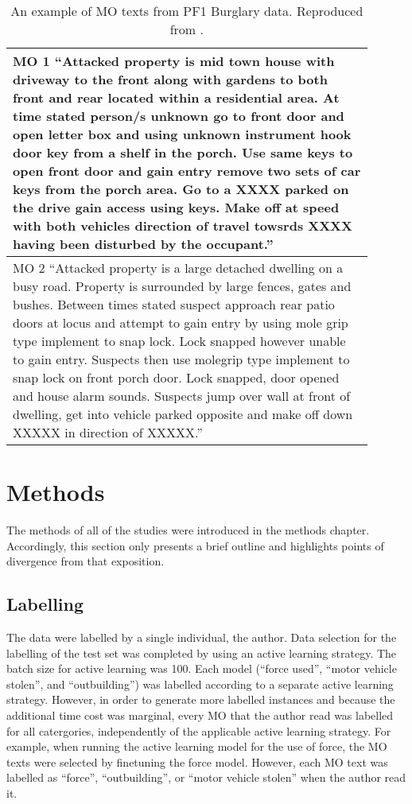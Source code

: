 \begin{table}[]
\begin{tabular}{p{0.9\linewidth}}
\toprule
MO 1 “Attacked property is mid town house with driveway to the front along with gardens to both front and rear located within a residential area. At time stated person/s unknown go to front door and open letter box and using unknown instrument hook door key from a shelf in the porch. Use same keys to open front door and gain entry remove two sets of car keys from the porch area. Go to a XXXX parked on the drive gain access using keys. Make off at speed with both vehicles direction of travel towsrds XXXX having been disturbed by the occupant.”             \\ \midrule
MO 2 “Attacked property is a large detached dwelling on a busy road. Property is surrounded by large fences, gates and bushes. Between times stated suspect approach rear patio doors at locus and attempt to gain entry by using mole grip type implement to snap lock. Lock snapped however unable to gain entry. Suspects then use molegrip type implement to snap lock on front porch door. Lock snapped, door opened and house alarm sounds. Suspects jump over wall at front of dwelling, get into vehicle parked opposite and make off down XXXXX in direction of XXXXX.” \\ \bottomrule
\end{tabular}
\caption[Example MO texts]{\label{tab:MOexample} An example of MO texts from PF1 Burglary data. Reproduced from \cite{birks}.}
\end{table}


\section{Methods} The methods of all of the studies were introduced in the methods chapter. Accordingly, this section only presents a brief outline and highlights points of divergence from that exposition. 

\subsection{Labelling} The data were labelled by a single individual, the author. Data selection for the labelling of the test set was completed by using an active learning strategy. The batch size for active learning was 100. Each model  (“force used”, “motor vehicle stolen”, and “outbuilding”) was labelled according to a separate active learning strategy. However, in order to generate more labelled instances and because the additional time cost was marginal, every MO that the author read was labelled for all catergories, independently of the applicable active learning strategy. For example, when running the active learning model for the use of force, the MO texts were selected by finetuning the force model. However, each MO text was labelled as “force”, “outbuilding”, or “motor vehicle stolen” when the author read it.

